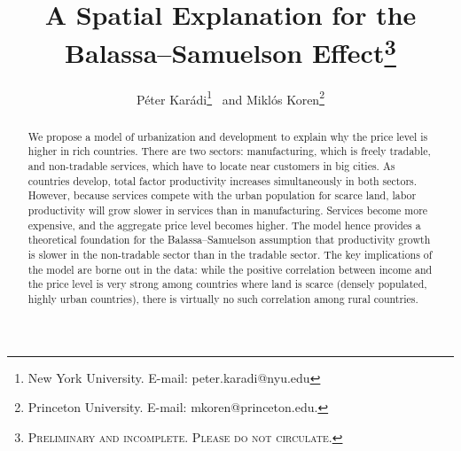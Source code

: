 \documentclass[12pt]{article}
\begin{document}
\title{A Spatial Explanation for the Balassa--Samuelson Effect\thanks{\textsc{Preliminary and incomplete. Please do not circulate.}}}
\author{P\'eter Kar\'adi\thanks{New York University. E-mail: peter.karadi@nyu.edu}~ and Mikl\'os Koren\thanks{Princeton University. E-mail: mkoren@princeton.edu.}}
\maketitle

\begin{abstract}
We propose a model of urbanization and development to explain why the price level is higher in rich countries. There are two sectors: manufacturing, which is freely tradable, and non-tradable services, which have to locate near customers in big cities. As countries develop, total factor productivity increases simultaneously in both sectors. However, because services compete with the urban population for scarce land, labor productivity will grow slower in services than in manufacturing. Services become more expensive, and the aggregate price level becomes higher. The model hence provides a theoretical foundation for the Balassa--Samuelson assumption that productivity growth is slower in the non-tradable sector than in the tradable sector. The key implications of the model are borne out in the data: while the positive correlation between income and the price level is very strong among countries where land is scarce (densely populated, highly urban countries), there is virtually no such correlation among rural countries.
\end{abstract}
\end{document}
